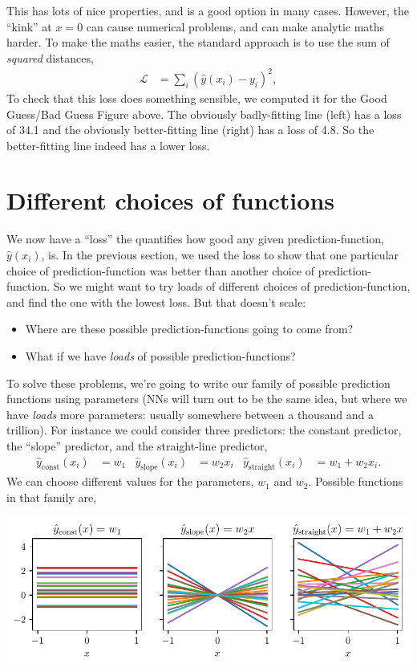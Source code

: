 \documentclass{article}
\newcommand{\yh}{\hat{y}}
\newcommand{\bracket}[3]{\left#1 #3 \right#2}
\renewcommand{\b}{\bracket{(}{)}}
\renewcommand{\L}{\mathcal{L}}
\begin{document}
This has lots of nice properties, and is a good option in many cases.
However, the ``kink'' at $x=0$ can cause numerical problems, and can make analytic maths harder.
To make the maths easier, the standard approach is to use the sum of \textit{squared} distances,
\begin{align}
  \L &= \sum_i \b{\yh(x_i) - y_i}^2,
\end{align}
To check that this loss does something sensible, we computed it for the Good Guess/Bad Guess Figure above.  The obviously badly-fitting line (left) has a loss of 34.1 and the obviously better-fitting line (right) has a loss of 4.8.
So the better-fitting line indeed has a lower loss.

\section{Different choices of functions}
We now have a ``loss'' the quantifies how good any given prediction-function, $\yh(x_i)$, is.
In the previous section, we used the loss to show that one particular choice of prediction-function was better than another choice of prediction-function.
So we might want to try loads of different choices of prediction-function, and find the one with the lowest loss.
But that doesn't scale:
\begin{itemize}
  \item Where are these possible prediction-functions going to come from?
  \item What if we have \textit{loads} of possible prediction-functions?
\end{itemize}
To solve these problems, we're going to write our family of possible prediction functions using parameters (NNs will turn out to be the same idea, but where we have \textit{loads} more parameters: usually somewhere between a thousand and a trillion).
For instance we could consider three predictors: the constant predictor, the ``slope'' predictor, and the straight-line predictor,
\begin{align}
  \yh_\text{const}(x_i) &= w_1 & 
  \yh_\text{slope}(x_i) &= w_2 x_i &
  \yh_\text{straight}(x_i) &= w_1 + w_2 x_i.
\end{align}
We can choose different values for the parameters, $w_1$ and $w_2$.
Possible functions in that family are,
\begin{center}
  \includegraphics[width=\textwidth]{families.pdf}
\end{center}
\end{document}

